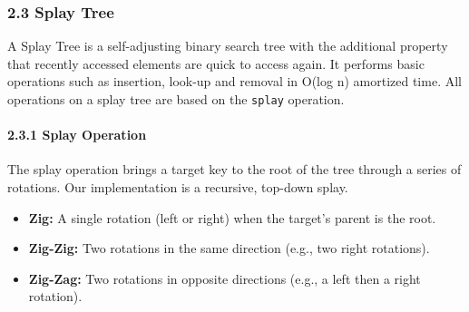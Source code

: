 \documentclass[
]{article}
\providecommand{\tightlist}{%
  \setlength{\itemsep}{0pt}\setlength{\parskip}{0pt}}
\begin{document}
\hypertarget{splay-tree}{%
\subsubsection{2.3 Splay Tree}\label{splay-tree}}

A Splay Tree is a self-adjusting binary search tree with the additional
property that recently accessed elements are quick to access again. It
performs basic operations such as insertion, look-up and removal in
O(log n) amortized time. All operations on a splay tree are based on the
\texttt{splay} operation.

\hypertarget{splay-operation}{%
\paragraph{2.3.1 Splay Operation}\label{splay-operation}}

The splay operation brings a target key to the root of the tree through
a series of rotations. Our implementation is a recursive, top-down
splay.

\begin{itemize}
\tightlist
\item
  \textbf{Zig:} A single rotation (left or right) when the target's
  parent is the root.
\item
  \textbf{Zig-Zig:} Two rotations in the same direction (e.g., two right
  rotations).
\item
  \textbf{Zig-Zag:} Two rotations in opposite directions (e.g., a left
  then a right rotation).
\end{itemize}
\end{document}
